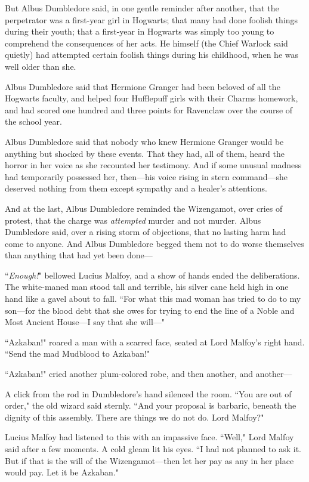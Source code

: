 But Albus Dumbledore said, in one gentle reminder after another, that the perpetrator was a first-year girl in Hogwarts; that many had done foolish things during their youth; that a first-year in Hogwarts was simply too young to comprehend the consequences of her acts. He himself (the Chief Warlock said quietly) had attempted certain foolish things during his childhood, when he was well older than she.

Albus Dumbledore said that Hermione Granger had been beloved of all the Hogwarts faculty, and helped four Hufflepuff girls with their Charms homework, and had scored one hundred and three points for Ravenclaw over the course of the school year.

Albus Dumbledore said that nobody who knew Hermione Granger would be anything but shocked by these events. That they had, all of them, heard the horror in her voice as she recounted her testimony. And if some unusual madness had temporarily possessed her, then—his voice rising in stern command—she deserved nothing from them except sympathy and a healer's attentions.

And at the last, Albus Dumbledore reminded the Wizengamot, over cries of protest, that the charge was \emph{attempted} murder and not murder. Albus Dumbledore said, over a rising storm of objections, that no lasting harm had come to anyone. And Albus Dumbledore begged them not to do worse themselves than anything that had yet been done—

``\emph{Enough!}" bellowed Lucius Malfoy, and a show of hands ended the deliberations. The white-maned man stood tall and terrible, his silver cane held high in one hand like a gavel about to fall. ``For what this mad woman has tried to do to my son—for the blood debt that she owes for trying to end the line of a Noble and Most Ancient House—I say that she will—"

``Azkaban!" roared a man with a scarred face, seated at Lord Malfoy's right hand. ``Send the mad Mudblood to Azkaban!"

``Azkaban!" cried another plum-colored robe, and then another, and another—

A click from the rod in Dumbledore's hand silenced the room. ``You are out of order," the old wizard said sternly. ``And your proposal is barbaric, beneath the dignity of this assembly. There are things we do not do. Lord Malfoy?"

Lucius Malfoy had listened to this with an impassive face. ``Well," Lord Malfoy said after a few moments. A cold gleam lit his eyes. ``I had not planned to ask it. But if that is the will of the Wizengamot—then let her pay as any in her place would pay. Let it be Azkaban."

